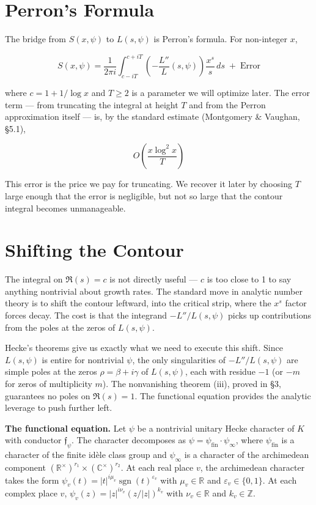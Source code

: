 \documentclass[12pt,a4paper]{article}
\newcommand{\pilcrow}{\S}
\begin{document}
\section{Perron's Formula}

The bridge from $S(x, \psi)$ to $L(s, \psi)$ is Perron's formula. For non-integer $x$,

\[
S(x, \psi) = \frac{1}{2\pi i} \int_{c-iT}^{c+iT} \left(-\frac{L''}{L}(s, \psi)\right) \frac{x^s}{s} \, ds \;+\; \text{Error}
\]

where $c = 1 + 1/\log x$ and $T \geq 2$ is a parameter we will optimize later. The error term --- from truncating the integral at height $T$ and from the Perron approximation itself --- is, by the standard estimate (Montgomery \& Vaughan, \pilcrow{}5.1),

\[
O\!\left(\frac{x \log^2 x}{T}\right)
\]

This error is the price we pay for truncating. We recover it later by choosing $T$ large enough that the error is negligible, but not so large that the contour integral becomes unmanageable.

\section{Shifting the Contour}

The integral on $\Re(s) = c$ is not directly useful --- $c$ is too close to 1 to say anything nontrivial about growth rates. The standard move in analytic number theory is to shift the contour leftward, into the critical strip, where the $x^s$ factor forces decay. The cost is that the integrand $-L''/L(s, \psi)$ picks up contributions from the poles at the zeros of $L(s, \psi)$.

Hecke's theorems give us exactly what we need to execute this shift. Since $L(s, \psi)$ is entire for nontrivial $\psi$, the only singularities of $-L''/L(s, \psi)$ are simple poles at the zeros $\rho = \beta + i\gamma$ of $L(s, \psi)$, each with residue $-1$ (or $-m$ for zeros of multiplicity $m$). The nonvanishing theorem (iii), proved in \pilcrow{}3, guarantees no poles on $\Re(s) = 1$. The functional equation provides the analytic leverage to push further left.

\textbf{The functional equation.} Let $\psi$ be a nontrivial unitary Hecke character of $K$ with conductor $\mathfrak{f}_{\psi}$. The character decomposes as $\psi = \psi_{\text{fin}} \cdot \psi_{\infty}$, where $\psi_{\text{fin}}$ is a character of the finite idèle class group and $\psi_{\infty}$ is a character of the archimedean component $(\mathbb{R}^\times)^{r_1} \times (\mathbb{C}^\times)^{r_2}$. At each real place $v$, the archimedean character takes the form $\psi_v(t) = |t|^{i\mu_v} \operatorname{sgn}(t)^{\varepsilon_v}$ with $\mu_v \in \mathbb{R}$ and $\varepsilon_v \in \{0,1\}$. At each complex place $v$, $\psi_v(z) = |z|^{i\nu_v} (z/|z|)^{k_v}$ with $\nu_v \in \mathbb{R}$ and $k_v \in \mathbb{Z}$.
\end{document}
